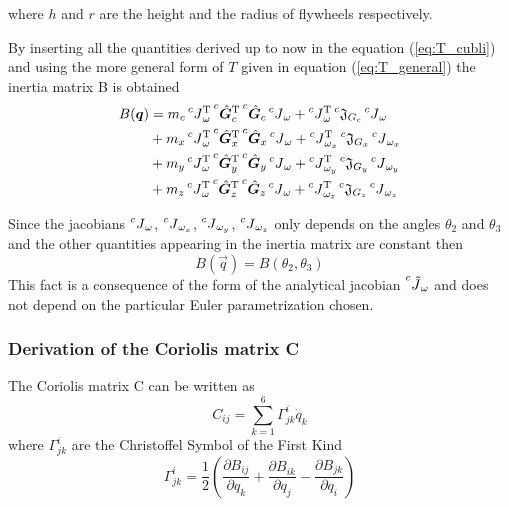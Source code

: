 where $h$ and $r$ are the height and the radius of flywheels respectively.
\par
By inserting all the quantities derived up to now in the equation (\ref{eq:T_cubli})
and using the more general form of $T$ given in equation (\ref{eq:T_general}) the inertia
matrix B is obtained
\[
\begin{split}
  B(\vec{q}) &= m_c \prescript{c}{}{J}_{\omega}\transpose \prescript{c}{}{\unitvec{G}}_{c} \transpose  \prescript{c}{}{\unitvec{G}}_{c} \prescript{c}{}{J}_{\omega} + \prescript{c}{}{J}_{\omega}\transpose  \prescript{c}{}{\mathfrak{J}}_{G_{c}} \prescript{c}{}{J}_{\omega} \\
  &+ m_x \prescript{c}{}{J}_{\omega}\transpose \prescript{c}{}{\unitvec{G}}_{x} \transpose  \prescript{c}{}{\unitvec{G}}_{x} \prescript{c}{}{J}_{\omega} + \prescript{c}{}{J}_{\omega_{x}}\transpose  \prescript{c}{}{\mathfrak{J}}_{G_{x}} \prescript{c}{}{J}_{\omega_{x}} \\
  &+ m_y \prescript{c}{}{J}_{\omega}\transpose \prescript{c}{}{\unitvec{G}}_{y} \transpose  \prescript{c}{}{\unitvec{G}}_{y} \prescript{c}{}{J}_{\omega} + \prescript{c}{}{J}_{\omega_{y}}\transpose  \prescript{c}{}{\mathfrak{J}}_{G_{y}} \prescript{c}{}{J}_{\omega_{y}} \\
  &+ m_z \prescript{c}{}{J}_{\omega}\transpose \prescript{c}{}{\unitvec{G}}_{z} \transpose  \prescript{c}{}{\unitvec{G}}_{z} \prescript{c}{}{J}_{\omega} + \prescript{c}{}{J}_{\omega_{z}}\transpose  \prescript{c}{}{\mathfrak{J}}_{G_{z}} \prescript{c}{}{J}_{\omega_{z}} \\
\end{split}
\]

Since the jacobians $\prescript{c}{}{J}_{\omega}$,
$\prescript{c}{}{J}_{\omega_{x}}$,
$\prescript{c}{}{J}_{\omega_{y}}$,
$\prescript{c}{}{J}_{\omega_{z}}$
only depends on the angles $\theta_2$ and $\theta_3$
and the other quantities appearing in the inertia matrix
are constant then
\[
B(\vec{q}) = B(\theta_2, \theta_3)
\]
This fact is a consequence of the form of the analytical jacobian
$\prescript{c}{}{\tilde{J}}_{\omega}$ and does not depend on the particular Euler parametrization chosen.

\subsubsection{Derivation of the Coriolis matrix C}
The Coriolis matrix C can be written as
\[
C_{ij} = \sum_{k=1}^6{\Gamma^i_{jk} \dot{q}_k}
\]
where $\Gamma^i_{jk}$ are the Christoffel Symbol of the First Kind
\[
\Gamma^i_{jk} = \frac{1}{2} \left ( \frac{\partial B_{ij}}{\partial q_k}
+ \frac{\partial B_{ik}}{\partial q_j}
- \frac{\partial B_{jk}}{\partial q_i}\right)
\]


